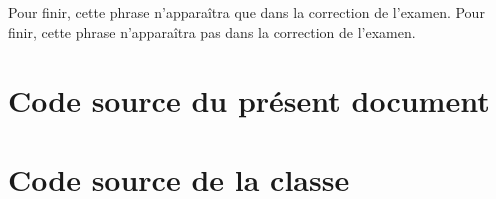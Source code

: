 \documentclass[addpoints,fr,biblatex,name,gradetable,marksdetail,markssum]{isae-exam}
\begin{document}
\ifprintanswers
  Pour finir, cette phrase n'apparaîtra que dans la correction de l'examen.
\else
  Pour finir, cette phrase n'apparaîtra pas dans la correction de l'examen.
\fi

\section{Code source du présent document}
\label{sec:code-source-doc}



\section{Code source de la classe}
\label{sec:code-source-classe}



\printbibliography
\end{document}
